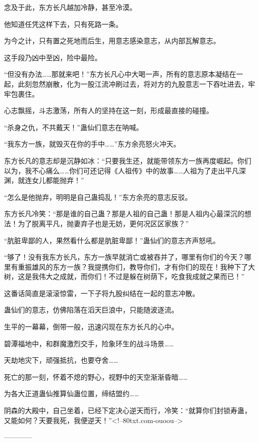 \begin{this_body}
念及于此，东方长凡越加冷静，甚至冷漠。

他知道任凭这样下去，只有死路一条。

为今之计，只有置之死地而后生，用意志感染意志，从内部瓦解意志。

这手段乃凶中至凶，险中最险。

“但没有办法……那就来吧！”东方长凡心中大喝一声，所有的意志原本凝结在一起，此刻忽然崩散，化为一股江流冲刷过去，将对方的九股意志一下吞吐进去，牢牢包裹住。

心志飘摇，斗志激荡，所有人的坚持在这一刻，形成最直接的碰撞。

“杀身之仇，不共戴天！”蛊仙们意志在呐喊。

“我东方一族，就毁灭在你的手中……”东方余亮怒火冲天。

东方长凡的意志却是沉静如冰：“只要我生还，就能带领东方一族再度崛起。你们以为，我不心痛么……你们可还记得《人祖传》中的故事……人祖为了走出平凡深渊，就连女儿都能抛弃！”

“怎么是他抛弃，明明是自己蛊捣乱！”东方余亮的意志反驳。

东方长凡冷笑：“那是谁的自己蛊？那是人祖的自己蛊！那是人祖内心最深沉的想法！为了脱离平凡，抛妻弃子也是无妨，更何况区区家族？”

“肮脏卑鄙的人，果然看什么都是肮脏卑鄙！”蛊仙们的意志齐声怒吼。

“够了！没有我东方长凡，东方一族早就消亡或被吞并了，哪里有你们的今天？哪里有重振雄风的东方一族？我提携你们，教导你们，才有你们的现在！我种下了大树，这是我伟大之成就，而你们！不过是躲在树荫下，吃食我成就之果而已！”

这番话简直是滚滚惊雷，一下子将九股纠结在一起的意志冲散。

蛊仙们的意志，仿佛陷落在滔天巨浪中，只能随波逐流。

生平的一幕幕，倒带一般，迅速闪现在东方长凡的心中。

碧潭福地中，和群魔激烈交手，险象环生的战斗场景……

天劫地灾下，顽强抵抗，也要夺舍……

死亡的那一刻，怀着不熄的野心，视野中的天空渐渐昏暗……

为各大正道蛊仙推算仙蛊位置，缔结盟约……

阴森的大殿中，自己坐着，已经下定决心逆天而行，冷笑：“就算你们封锁寿蛊，又能如何？天要我死，我便逆天！”<!--80txt.com-ouoou-->

------------

\end{this_body}

